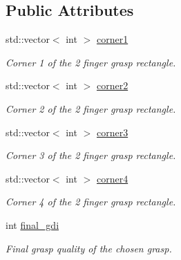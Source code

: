 \subsection*{Public Attributes}
\begin{DoxyCompactItemize}
\item 
\mbox{\label{classTwoFinger_a9e74a374c5214aec993bf4dfe856c93c}} 
std\+::vector$<$ int $>$ \hyperlink{classTwoFinger_a9e74a374c5214aec993bf4dfe856c93c}{corner1}
\begin{DoxyCompactList}\small\item\em Corner 1 of the 2 finger grasp rectangle. \end{DoxyCompactList}\item 
\mbox{\label{classTwoFinger_a860d34e5fbd57556fe8313e40eefe5f6}} 
std\+::vector$<$ int $>$ \hyperlink{classTwoFinger_a860d34e5fbd57556fe8313e40eefe5f6}{corner2}
\begin{DoxyCompactList}\small\item\em Corner 2 of the 2 finger grasp rectangle. \end{DoxyCompactList}\item 
\mbox{\label{classTwoFinger_a3ef052222752b0fc0ed4ef951d89b4e1}} 
std\+::vector$<$ int $>$ \hyperlink{classTwoFinger_a3ef052222752b0fc0ed4ef951d89b4e1}{corner3}
\begin{DoxyCompactList}\small\item\em Corner 3 of the 2 finger grasp rectangle. \end{DoxyCompactList}\item 
\mbox{\label{classTwoFinger_a88c6337a2c26521c81d849fa4e244256}} 
std\+::vector$<$ int $>$ \hyperlink{classTwoFinger_a88c6337a2c26521c81d849fa4e244256}{corner4}
\begin{DoxyCompactList}\small\item\em Corner 4 of the 2 finger grasp rectangle. \end{DoxyCompactList}\item 
\mbox{\label{classTwoFinger_ab9eb97029e3fe8e4c9c3e931fde0b652}} 
int \hyperlink{classTwoFinger_ab9eb97029e3fe8e4c9c3e931fde0b652}{final\+\_\+gdi}
\begin{DoxyCompactList}\small\item\em Final grasp quality of the chosen grasp. \end{DoxyCompactList}\item 

\end{DoxyCompactItemize}
